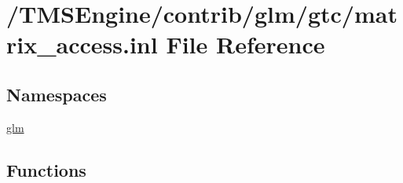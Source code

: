 \hypertarget{matrix__access_8inl}{}\section{/\+T\+M\+S\+Engine/contrib/glm/gtc/matrix\+\_\+access.inl File Reference}
\label{matrix__access_8inl}
\subsection*{Namespaces}
\begin{DoxyCompactItemize}
\item 
 \hyperlink{namespaceglm}{glm}
\end{DoxyCompactItemize}
\subsection*{Functions}
